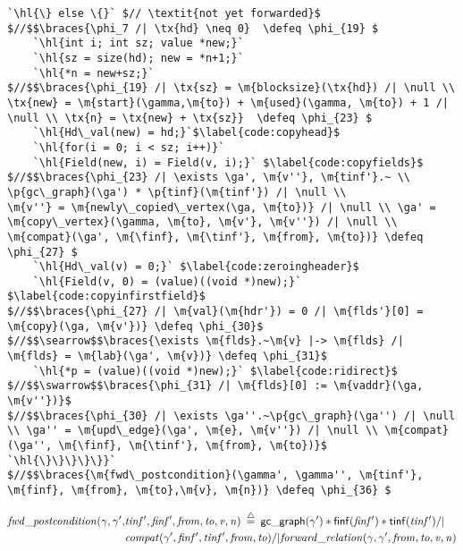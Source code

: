 \begin{figure*}[!ht]
\begin{lstlisting}[multicols=2]
   `\hl{\} else \{}` $// \textit{not yet forwarded}$
$//$$\braces{\phi_7 /| \tx{hd} \neq 0}  \defeq \phi_{19} $
    `\hl{int i; int sz; value *new;}`
    `\hl{sz = size(hd); new = *n+1;}`
    `\hl{*n = new+sz;}`
$//$$\braces{\phi_{19} /| \tx{sz} = \m{blocksize}(\tx{hd}) /| \null \\ \tx{new} = \m{start}(\gamma,\m{to}) + \m{used}(\gamma, \m{to}) + 1 /| \null \\ \tx{n} = \tx{new} + \tx{sz}}  \defeq \phi_{23} $      
    `\hl{Hd\_val(new) = hd;}`$\label{code:copyhead}$
    `\hl{for(i = 0; i < sz; i++)}` 
    `\hl{Field(new, i) = Field(v, i);}` $\label{code:copyfields}$
$//$$\braces{\phi_{23} /| \exists \ga', \m{v''}, \m{tinf'}.~ \\ \p{gc\_graph}(\ga') * \p{tinf}(\m{tinf'}) /| \null \\ 
\m{v''} = \m{newly\_copied\_vertex(\ga, \m{to})} /| \null \\ \ga' = \m{copy\_vertex}(\gamma, \m{to}, \m{v'}, \m{v''}) /| \null \\ \m{compat}(\ga', \m{\finf}, \m{\tinf'}, \m{from}, \m{to})} \defeq \phi_{27} $
    `\hl{Hd\_val(v) = 0;}` $\label{code:zeroingheader}$
    `\hl{Field(v, 0) = (value)((void *)new);}` $\label{code:copyinfirstfield}$
$//$$\braces{\phi_{27} /| \m{val}(\m{hdr'}) = 0 /| \m{flds'}[0] = \m{copy}(\ga, \m{v'})} \defeq \phi_{30}$
$//$$\searrow$$\braces{\exists \m{flds}.~\m{v} |-> \m{flds} /| \m{flds} = \m{lab}(\ga', \m{v})} \defeq \phi_{31}$
    `\hl{*p = (value)((void *)new);}` $\label{code:ridirect}$
$//$$\swarrow$$\braces{\phi_{31} /| \m{flds}[0] := \m{vaddr}(\ga, \m{v''})}$
$//$$\braces{\phi_{30} /| \exists \ga''.~\p{gc\_graph}(\ga'') /| \null \\ \ga'' = \m{upd\_edge}(\ga', \m{e}, \m{v''}) /| \null \\ \m{compat}(\ga'', \m{\finf}, \m{\tinf'}, \m{from}, \m{to})}$
`\hl{\}\}\}\}\}}`
$//$$\braces{\m{fwd\_postcondition}(\gamma', \gamma'', \m{tinf'}, \m{finf}, \m{from}, \m{to},\m{v}, \m{n})} \defeq \phi_{36} $
\end{lstlisting}
\footnotesize{
\vspace{-0.8em}
\begin{equation*}
\begin{split}
\m{fwd\_postcondition}(\gamma, \ga', &\m{tinf'}, \m{finf'}, \m{from}, \m{to}, \m{v}, \m{n}) \; \defeq \; 
   \p{gc{\_}graph}(\ga') * \p{\finf}(\m{\finf'}) * \p{\tinf}(\m{\tinf'}) /| \null \\
   &\m{compat}(\ga', \m{\finf'}, \m{\tinf'}, \m{from}, \m{to}) /|
   \m{forward\_relation}(\ga, \ga', \m{from}, \m{to}, \m{v}, \m{n})
\end{split}
\end{equation*}

}
\vspace{-0.4em}
\caption{Clight code and proof sketch for forward}
\label{fig:forward}
\vspace{-1em}
\end{figure*}

\renewcommand{\tx}[1]{\text{#1}}

